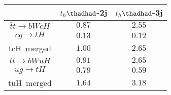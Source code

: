 
\centering
\begin{tabular}{ccc} \toprule\toprule
& $t_{h}\thadhad$-2j & $t_{h}\thadhad$-3j\\\midrule
$\bar{t}t\to bWcH$ & $0.87$ & $2.55$ \\
$cg\to tH$ &  $0.13$        & $0.12$ \\
tcH~merged &  $1.00$        & $2.65$  \\
$\bar{t}t\to bWuH$ & $0.91$ & $2.65$   \\
$ug\to tH$ & $0.79$         & $0.59$   \\
tuH~merged & $1.64$         & $3.18$   \\
\bottomrule\bottomrule
\end{tabular}